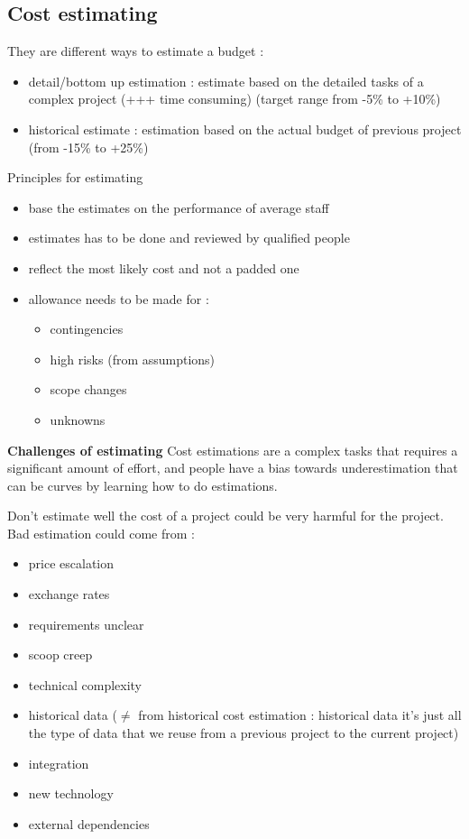 \documentclass{article}
\begin{document}
\subsection{Cost estimating}
They are different ways to estimate a budget :
\begin{itemize}
	\item detail/bottom up estimation : estimate based on the detailed tasks of a complex project (+++ time consuming) (target range from -5\% to +10\%)
	\item historical estimate : estimation based on the actual budget of previous project (from -15\% to +25\%)
\end{itemize}


Principles for estimating 
\begin{itemize}
	\item base the estimates on the performance of average staff
	\item estimates has to be done and reviewed by qualified people
	\item reflect the most likely cost and not a padded one
	\item allowance needs to be made for :
	\begin{itemize}
		\item contingencies
		\item high risks (from assumptions)
		\item scope changes
		\item unknowns
	\end{itemize} 
\end{itemize}


\noindent\textbf{Challenges of estimating}\newline
Cost estimations are a complex tasks that requires a significant amount of effort, and people have a bias towards underestimation that can be curves by learning how to do estimations.\newline

Don't estimate well the cost of a project could be very harmful for the project. Bad estimation could come from :
\begin{itemize}
	\item price escalation
	\item exchange rates
	\item requirements unclear
	\item scoop creep
	\item technical complexity
	\item historical data ($\neq$ from historical cost estimation : historical data it's just all the type of data that we reuse from a previous project to the current project)
	\item integration
	\item new technology
	\item external dependencies
\end{itemize}
\end{document}
